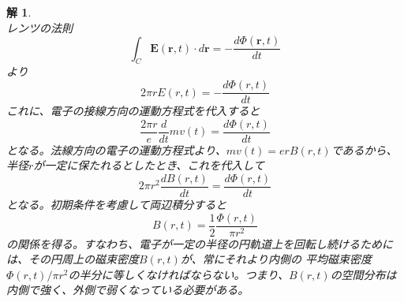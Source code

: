 \documentclass{jsarticle}
\newtheorem{ans}{解}[section]
\begin{document}
\begin{ans}~\\
    レンツの法則
    \begin{equation*}
        \int_{C}\bm{E}(\bm{r},t)\cdot d\bm{r}=-\frac{d\Phi(\bm{r},t)}{dt}
    \end{equation*}
    より
    \begin{equation*}
        2\pi rE(r,t) = -\frac{d\Phi(r,t)}{dt}
    \end{equation*}
    これに、電子の接線方向の運動方程式を代入すると
    \begin{equation*}
        \frac{2\pi r}{e}\frac{d}{dt}mv(t) = \frac{d\Phi(r,t)}{dt}
    \end{equation*}
    となる。法線方向の電子の運動方程式より、\(mv(t)=erB(r,t)\)であるから、半径\(r\)が一定に保たれるとしたとき、これを代入して
    \begin{equation*}
        2\pi r^{2}\frac{dB(r,t)}{dt} = \frac{d\Phi(r,t)}{dt}
    \end{equation*}
    となる。初期条件を考慮して両辺積分すると
    \begin{equation*}
        B(r,t) = \frac{1}{2}\frac{\Phi(r,t)}{\pi r^{2}}
    \end{equation*}
    の関係を得る。すなわち、電子が一定の半径の円軌道上を回転し続けるためには、その円周上の磁束密度\(B(r,t)\)が、常にそれより内側の
    平均磁束密度\(\Phi(r,t)/\pi r^{2}\)の半分に等しくなければならない。つまり、\(B(r,t)\)の空間分布は内側で強く、外側で弱くなっている必要がある。
\end{ans}
\end{document}
